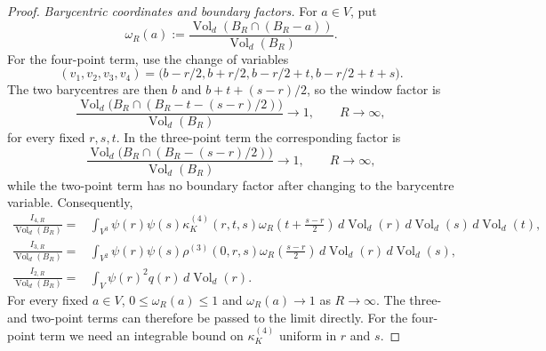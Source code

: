 \documentclass[11pt,reqno,a4paper]{amsart}
\numberwithin{equation}{section}
\theoremstyle{compact}
\theoremstyle{definition}
\theoremstyle{definition}
\newcommand{\Vol}{\operatorname{Vol}}
\begin{document}
\begin{proof}
\smallskip\noindent\emph{Barycentric coordinates and boundary factors.}
For $a\in V$, put
\begin{equation}\label{eq:dpp-overlap-function}
  \omega_R(a)
  :=\frac{\Vol_d(B_R\cap(B_R-a))}{\Vol_d(B_R)}.
\end{equation}
For the four-point term, use the change of variables
\begin{equation}\label{eq:dpp-four-point-coordinates}
  (v_1,v_2,v_3,v_4)
  =\big(b-r/2,b+r/2,b-r/2+t,b-r/2+t+s\big).
\end{equation}
The two barycentres are then $b$ and $b+t+(s-r)/2$, so the window factor is
\begin{equation}\label{eq:dpp-four-point-overlap}
  \frac{
    \Vol_d\big(B_R\cap(B_R-t-(s-r)/2)\big)
  }{\Vol_d(B_R)}
  \longrightarrow 1,
  \qquad R\to\infty,
\end{equation}
for every fixed $r,s,t$.  In the three-point term the corresponding factor is
\begin{equation}\label{eq:dpp-three-point-overlap}
  \frac{
    \Vol_d\big(B_R\cap(B_R-(s-r)/2)\big)
  }{\Vol_d(B_R)}
  \longrightarrow 1,
  \qquad R\to\infty,
\end{equation}
while the two-point term has no boundary factor after changing to the
barycentre variable.  Consequently,
\begin{align}
  \frac{I_{4,R}}{\Vol_d(B_R)}
  ={}&\int_{V^3}\psi(r)\psi(s)\kappa_K^{(4)}(r,t,s)
       \omega_R\!\left(t+\frac{s-r}{2}\right)
       \,d\Vol_d(r)\,d\Vol_d(s)\,d\Vol_d(t),
       \label{eq:dpp-I4R-overlap}\\
  \frac{I_{3,R}}{\Vol_d(B_R)}
  ={}&\int_{V^2}\psi(r)\psi(s)\rho^{(3)}(0,r,s)
       \omega_R\!\left(\frac{s-r}{2}\right)
       \,d\Vol_d(r)\,d\Vol_d(s),
       \label{eq:dpp-I3R-overlap}\\
  \frac{I_{2,R}}{\Vol_d(B_R)}
  ={}&\int_V\psi(r)^2q(r)\,d\Vol_d(r).
       \label{eq:dpp-I2R-overlap}
\end{align}
For every fixed $a\in V$, $0\leq\omega_R(a)\leq1$ and
$\omega_R(a)\to1$ as $R\to\infty$.  The three- and two-point terms can
therefore be passed to the limit directly.  For the four-point term we need
an integrable bound on $\kappa_K^{(4)}$ uniform in $r$ and $s$.


\end{proof}
\end{document}
